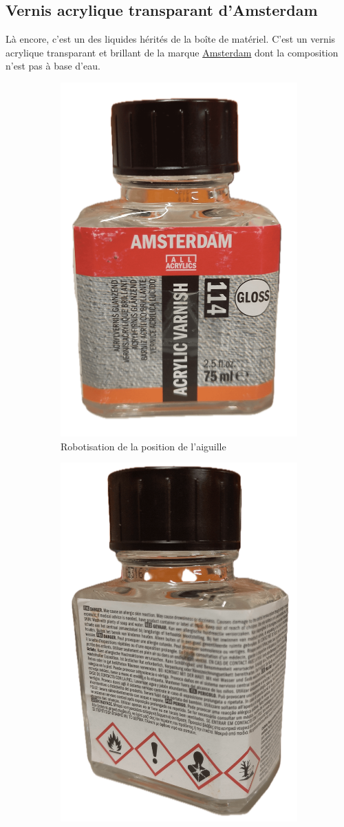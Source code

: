 \subsection{Vernis acrylique transparant d'Amsterdam}
Là encore, c'est un des liquides hérités de la boîte de matériel. C'est un vernis acrylique transparant et brillant de la marque \href{https://www.amsterdam-acrylics.com/fr/}{Amsterdam} dont la composition
n'est pas à base d'eau.
\begin{figure}[H]
    \centering
    \begin{subfigure}{.5\textwidth}
        \centering
        \includegraphics[width=0.6\linewidth]{assets/figures/etat_art/Amsterdam_vernis_acrylique.png}
        \caption{Robotisation de la position de l'aiguille}
        \label{fig:vernis_amsterdam_front}
    \end{subfigure}%
    \begin{subfigure}{.5\textwidth}
        \centering
        \includegraphics[width=0.6\linewidth]{assets/figures/etat_art/Amsterdam_vernis_acrylique_dos.png}

\end{subfigure}
\end{figure}
